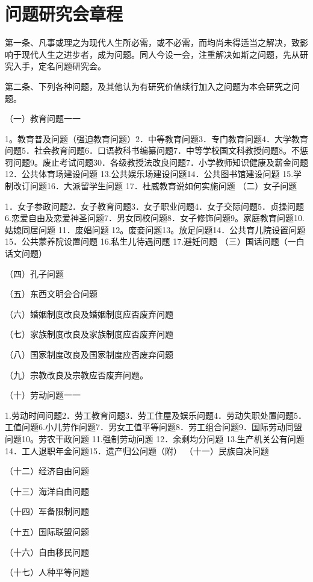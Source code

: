 \section{问题研究会章程}



第一条、凡事或理之为现代人生所必需，或不必需，而均尚未得适当之解决，致影响于现代人生之进步者，成为问题。同人今设一会，注重解决如斯之问题，先从研究入手，定名问题研究会。

第二条、下列各种问题，及其他认为有研究价值续行加入之问题为本会研究之问题。

（一）教育问题一一

1。教育普及问题（强迫教育问题）2．中等教育问题3．专门教育问题4．大学教育问题5．社会教育问题6．口语教科书编纂问题7．中等学校国文科教授问题8。不惩罚问题9。废止考试问题30．各级教授法改良问题7．小学教师知识健康及薪金问题12．公共体育场建设问题 13.公共娱乐场建设问题14．公共图书馆建设问题 15.学制改订问题16．大派留学生问题 17．杜威教育说如何实施问题 
（二）女子问题

1．女子参政问题2．女子教育问题3．女子职业问题4．女子交际问题5．贞操问题6.恋爱自由及恋爱神圣问题7．男女同校问题8．女子修饰问题9。家庭教育问题10.姑媳同居问题 11．废娼问题 12。废妾问题13。放足问题14．公共育儿院设置问题15．公共蒙养院设置问题 16.私生儿待遇问题 17.避妊问题 
（三）国话问题（一白话文问题）

（四）孔子问题

（五）东西文明会合问题

（六）婚姻制度改良及婚姻制度应否废弃问题

（七）家族制度改良及家族制度应否废弃问题

（八）国家制度改良及国家制度应否废弃问题

（九）宗教改良及宗教应否废弃问题。

（十）劳动问题一一

1.劳动时间问题2．劳工教育问题3．劳工住屋及娱乐问题4．劳动失职处置问题5．工值问题6.小儿劳作问题7．男女工值平等问题8．劳工组合问题9．国际劳动同盟问题10。劳农干政问题 11.强制劳动问题 12．余剩均分问题 13.生产机关公有问题  14．工人退职年金问题15．遗产归公问题（附）
（十一）民族自决问题

（十二）经济自由问题

（十三）海洋自由问题

（十四）军备限制问题

（十五）国际联盟问题

（十六）自由移民问题

（十七）人种平等问题

